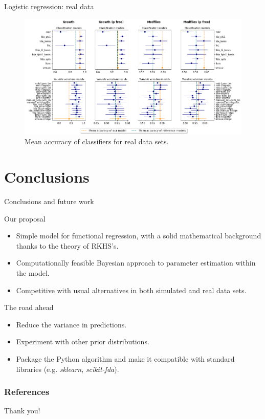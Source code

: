 \documentclass[10pt, english, professionalfonts]{beamer}
\begin{document}
\begin{frame}{Logistic regression: real data}
    \vspace{1em}
  \begin{figure}
    \includegraphics[width=\textwidth]{img/clf_emcee_real}
    \caption{Mean accuracy of classifiers for real data sets.}
  \end{figure}
\end{frame}


\section{Conclusions}

\begin{frame}{Conclusions and future work}

  \begin{alertblock}{Our proposal}
    \begin{itemize}
      \item Simple model for functional regression, with a solid mathematical background thanks to the theory of RKHS's.
      \item Computationally feasible Bayesian approach to parameter estimation within the model.
      \item Competitive with usual alternatives in both simulated and real data sets.
    \end{itemize}
  \end{alertblock}

  \begin{exampleblock}{The road ahead}
    \begin{itemize}
      \item Reduce the variance in predictions.
      \item Experiment with other prior distributions.
      \item Package the Python algorithm and make it compatible with standard libraries (e.g. \textit{sklearn}, \textit{scikit-fda}).
    \end{itemize}
  \end{exampleblock}


\end{frame}

\begin{frame}[allowframebreaks]
    \frametitle{References}
    \nocite{*}
    \printbibliography[heading=none]
\end{frame}

\begin{frame}[standout]
  Thank you!
\end{frame}
\end{document}
